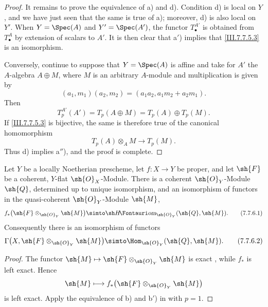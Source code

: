 {\begin{proof}
It remains to prove the equivalence of a) and d).  Condition
d) is local on $Y$, and we have just seen that the same is
true of a); moreover, d) is also local on $Y'$.  When
$Y=\Spec(A)$ and $Y'=\Spec(A')$, the functor
$T^{A'}_\bullet$ is obtained from $T^A_\bullet$ by extension
of scalars to $A'$.  It is then clear that a$'$) implies
that \eqref{III.7.7.5.3} is an isomorphism.

Conversely, continue to suppose that $Y=\Spec(A)$ is affine
and take for $A'$ the $A$-algebra $A\oplus M$, where $M$ is
an arbitrary $A$-module and multiplication is given by
\[
  (a_1,m_1)(a_2,m_2)
  =
  (a_1a_2,a_1m_2+a_2m_1).
\]
Then
\[
  T^{A'}_p(A')
  =
  T_p(A\oplus M)
  =
  T_p(A)\oplus T_p(M).
\]
If \eqref{III.7.7.5.3} is bijective, the same is therefore
true of the canonical homomorphism
\[
  T_p(A)\otimes_A M\longrightarrow T_p(M).
\]
Thus d) implies a$''$), and the proof is complete.
\end{proof}

\begin{theorem}[7.7.6]
\label{III.7.7.6}
Let $Y$ be a locally Noetherian prescheme, let
$f:X\to Y$ be proper, and let $\sh{F}$ be a coherent,
$Y$-flat $\sh{O}_X$-Module.  There is a coherent
$\sh{O}_Y$-Module $\sh{Q}$, determined up to unique
isomorphism, and an isomorphism of functors in the
quasi-coherent $\sh{O}_Y$-Module $\sh{M}$,
\[
  f_*
  \bigl(\sh{F}\otimes_{\sh{O}_Y}\sh{M}\bigr)
  \simto
  \shHom_{\sh{O}_Y}(\sh{Q},\sh{M}).
  \tag{7.7.6.1}\label{III.7.7.6.1}
\]
Consequently there is an isomorphism of functors
\[
  \Gamma
  \bigl(X,\sh{F}\otimes_{\sh{O}_Y}\sh{M}\bigr)
  \simto
  \Hom_{\sh{O}_Y}(\sh{Q},\sh{M}).
  \tag{7.7.6.2}\label{III.7.7.6.2}
\]
\end{theorem}

\begin{proof}
The functor
$\sh{M}\mapsto
 \sh{F}\otimes_{\sh{O}_Y}\sh{M}$
is exact , while $f_*$ is left exact.
Hence
\[
  \sh{M}\longmapsto
  f_*
  \bigl(\sh{F}\otimes_{\sh{O}_Y}\sh{M}\bigr)
\]
is left exact.  Apply the equivalence of b) and b$'$) in
 with $p=1$.
\end{proof}
}

